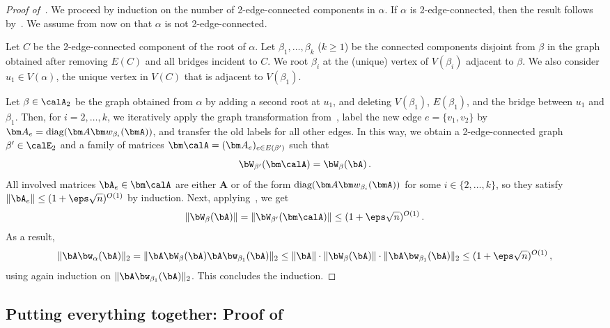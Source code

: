 \begin{proof}[Proof of~]
    We proceed by induction on the number of
    2-edge-connected components in $\alpha$. If $\alpha$ is
    2-edge-connected, then the result 
    follows by~. We assume
    from now on that $\alpha$ is not 2-edge-connected.

    Let $C$ be the 2-edge-connected component of the root of $\alpha$. Let $\beta_1, \ldots, \beta_k$ 
    ($k\ge 1$) be the 
    connected components disjoint from $\beta$ in 
    the graph obtained
    after removing $E(C)$ and all bridges
    incident to $C$. We root $\beta_i$ at the
    (unique) vertex of $V(\beta_i)$ adjacent to $\beta$. We also consider
    $u_1\in V(\alpha)$, the unique vertex in $V(C)$
    that is adjacent to $V(\beta_1)$.

    Let $\beta\in\calA_2$ be the graph obtained
    from $\alpha$ by adding a second root at $u_1$, and deleting $V(\beta_1)$, $E(\beta_1)$, and the bridge between $u_1$ and $\beta_1$.
    Then, for $i = 2, \ldots, k$, we
    iteratively apply the graph transformation from~,
    label the new edge $e=\{v_1,v_2\}$ by $\bm A_e = \text{diag}(\bm A \bm w_{\beta_i}(\bmA))$, and transfer the old labels for all
    other edges. In this way, we obtain
    a 2-edge-connected graph $\beta'\in\calE_2$ and a family of matrices $\bm \calA = (\bm A_{e})_{e\in E(\beta')}$ such that \[\bW_{\beta'}(\bm \calA) = \bW_{\beta}(\bA)\,.\] All involved matrices $\bA_e\in\bm \calA$ are either $\bm A$ or of the form 
    $\text{diag}(\bm A \bm w_{\beta_i}(\bmA))$ for some $i\in \{2, \ldots, k\}$, so they
    satisfy
    $\|\bA_e\|\le (1 + \eps \sqrt n)^{O(1)}$ by induction.
    Next, applying~, we get
    \[
        \|\bW_\beta(\bA)\| = \|\bW_{\beta'}(\bm \calA)\|\le (1 + \eps \sqrt n)^{O(1)}\,.
    \]
    As a result,
    \[
        \|\bA \bw_\alpha(\bA)\|_2 = \|\bA \bW_\beta(\bA) \bA \bw_{\beta_1}(\bA)\|_2\le \|\bA\| \cdot \|\bW_\beta(\bA)\| \cdot \|\bA \bw_{\beta_1}(\bA)\|_2 \le (1 + \eps \sqrt n)^{O(1)}\,,
    \]
    using again induction on $\|\bA \bw_{\beta_1}(\bA)\|_2$. This concludes the induction.
\end{proof}

\subsection{Putting everything together\texorpdfstring{: Proof of~}{}}

